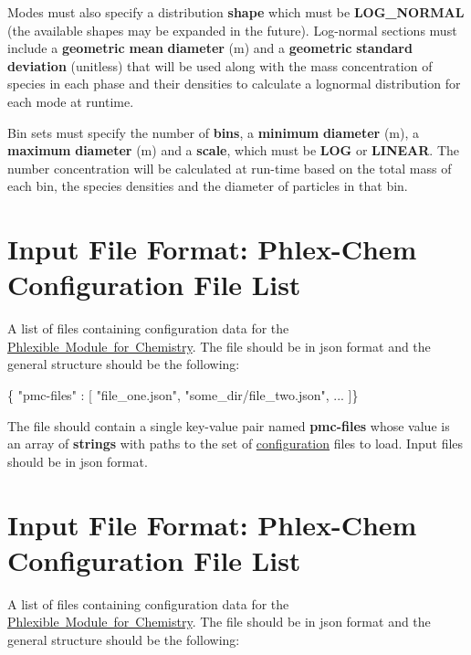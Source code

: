 Modes must also specify a distribution {\bfseries shape} which must be {\bfseries L\+O\+G\+\_\+\+N\+O\+R\+M\+AL} (the available shapes may be expanded in the future). Log-\/normal sections must include a {\bfseries geometric} {\bfseries mean} {\bfseries diameter} (m) and a {\bfseries geometric} {\bfseries standard} {\bfseries deviation} (unitless) that will be used along with the mass concentration of species in each phase and their densities to calculate a lognormal distribution for each mode at runtime.

Bin sets must specify the number of {\bfseries bins}, a {\bfseries minimum} {\bfseries diameter} (m), a {\bfseries maximum} {\bfseries diameter} (m) and a {\bfseries scale}, which must be {\bfseries L\+OG} or {\bfseries L\+I\+N\+E\+AR}. The number concentration will be calculated at run-\/time based on the total mass of each bin, the species densities and the diameter of particles in that bin. \hypertarget{input_format_phlex_file_list}{}\section{Input File Format\+: Phlex-\/\+Chem Configuration File List}\label{input_format_phlex_file_list}
A list of files containing configuration data for the \mbox{\hyperlink{phlex_chem}{Phlexible Module for Chemistry}}. The file should be in {\ttfamily json} format and the general structure should be the following\+:


\begin{DoxyCode}
\{ "pmc-files" : [
  "file\_one.json",
  "some\_dir/file\_two.json",
  ...
]\}
\end{DoxyCode}
 The file should contain a single key-\/value pair named {\bfseries pmc-\/files} whose value is an array of {\bfseries strings} with paths to the set of \mbox{\hyperlink{input_format_phlex_config}{configuration}} files to load. Input files should be in {\ttfamily json} format. \hypertarget{input_format_phlex_file_list}{}\section{Input File Format\+: Phlex-\/\+Chem Configuration File List}\label{input_format_phlex_file_list}
A list of files containing configuration data for the \mbox{\hyperlink{phlex_chem}{Phlexible Module for Chemistry}}. The file should be in {\ttfamily json} format and the general structure should be the following\+:


